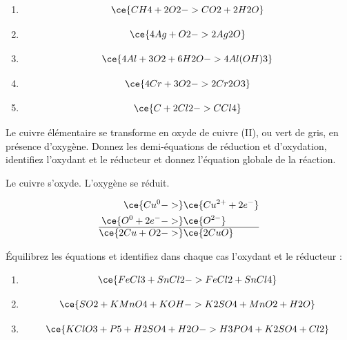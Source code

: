 \documentclass[
  11pt,
  a4paper,
  openany]{book}
\providecommand{\tightlist}{%
  \setlength{\itemsep}{0pt}\setlength{\parskip}{0pt}}
\begin{document}
\begin{Answer}

\begin{enumerate}
\def\labelenumi{\alph{enumi}.}
\tightlist
\item
  \[
  \ce{CH4 + 2O2 -> CO2 + 2H2O}
  \]
\item
  \[
  \ce{4Ag + O2 -> 2Ag2O}
  \]
\item
  \[
  \ce{4Al + 3O2 + 6H2O -> 4 Al(OH)3}
  \]
\item
  \[
  \ce{4Cr + 3O2 -> 2Cr2O3}
  \]
\item
  \[
  \ce{C + 2Cl2 -> CCl4}
  \]
\end{enumerate}

\end{Answer}

\clearpage

\begin{Exercise}
Le cuivre élémentaire se transforme en oxyde de cuivre (II), ou vert de gris, en présence d'oxygène. Donnez les demi-équations de réduction et d'oxydation, identifiez l'oxydant et le réducteur et donnez l'équation globale de la réaction.

\end{Exercise}

\begin{Answer}
Le cuivre s'oxyde. L'oxygène se réduit.

\[
\begin{split}
\ce{Cu^{0} ->} & \ce{Cu^{2+} + 2 e^-} \\
\ce{O^{0} + 2 e^- ->} & \ce{O^{2-}} \\
\hline
\ce{2 Cu + O2 ->} & \ce{2 CuO}
\end{split}
\]

\end{Answer}

\begin{Exercise}

Équilibrez les équations et identifiez dans chaque cas l'oxydant et le réducteur :

\begin{enumerate}
\def\labelenumi{\alph{enumi}.}
\tightlist
\item
  \[
  \ce{FeCl3 + SnCl2 -> FeCl2 + SnCl4}
  \]
\item
  \[
  \ce{SO2 + KMnO4 + KOH -> K2SO4 + MnO2 + H2O}
  \]
\item
  \[
  \ce{KClO3 + P5 + H2SO4 + H2O -> H3PO4 + K2SO4 + Cl2}
  \]
\end{enumerate}

\end{Exercise}
\end{document}
